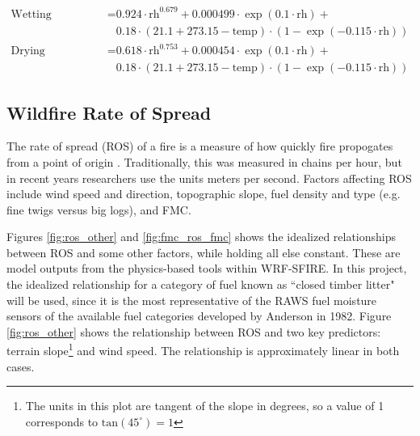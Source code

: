 \documentclass[11pt]{article}%
\begin{document}
\begin{equation}
\label{eq:equil}
\begin{split}
\text{Wetting Equilibrium} = &0.924\cdot\text{rh}^{0.679} + 0.000499\cdot\exp(0.1\cdot\text{rh}) + \\ &0.18\cdot(21.1 + 273.15 - \text{temp})\cdot(1 - \exp(-0.115\cdot\text{rh})) \\
\text{Drying Equilibrium} = &0.618\cdot\text{rh}^{0.753} + 0.000454\cdot\exp(0.1\cdot\text{rh}) + \\ &0.18\cdot(21.1 + 273.15 - \text{temp})\cdot(1 - \exp(-0.115\cdot\text{rh}))
\end{split}
\end{equation}

\subsection{Wildfire Rate of Spread}

The rate of spread (ROS) of a fire is a measure of how quickly fire propogates from a point of origin \cite{NFSC-2024-MFB}. Traditionally, this was measured in chains per hour, but in recent years researchers use the units meters per second. Factors affecting ROS include wind speed and direction, topographic slope, fuel density and type (e.g. fine twigs versus big logs), and FMC. 

Figures \ref{fig:ros_other} and \ref{fig:fmc_ros_fmc} shows the idealized relationships between ROS and some other factors, while holding all else constant. These are model outputs from the physics-based tools within WRF-SFIRE. In this project, the idealized relationship for a category of fuel known as ``closed timber litter" will be used, since it is the most representative of the RAWS fuel moisture sensors of the available fuel categories developed by Anderson in 1982. \cite{NIFC-2024-FAF} Figure \ref{fig:ros_other} shows the relationship between ROS and two key predictors: terrain slope\footnote{The units in this plot are tangent of the slope in degrees, so a value of 1 corresponds to $\text{tan} (45^\circ) = 1$} and wind speed. \cite{OpenWFM-2024-HTD} The relationship is approximately linear in both cases.
\end{document}
